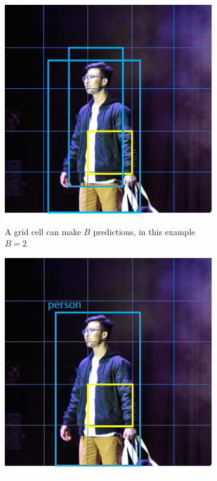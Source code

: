 \begin{figure}[ht]
	\begin{subfigure}[b]{.45\textwidth}
		\centering
		\includegraphics[width=1.0\linewidth]{img/chapter5_implementation/yoloAlgo1.png}
		\caption{A grid cell can make $B$ predictions, in this example $B=2$}
	\end{subfigure}%
	\hspace{\fill} 
	\begin{subfigure}[b]{.45\textwidth}
		\centering
		\includegraphics[width=1.0\linewidth]{img/chapter5_implementation/yoloAlgo.png}

\end{subfigure}
\end{figure}
